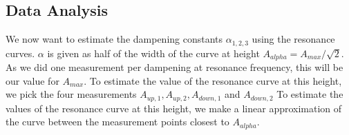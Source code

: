 \subsection{Data Analysis}

We now want to estimate the dampening constants $\alpha_{1, 2, 3}$ using the resonance curves.
$\alpha$ is given as half of the width of the curve at height $A_{alpha} = A_{max}/\sqrt{2}$.
As we did one measurement per dampening at resonance frequency, this will be our value for $A_{max}$.
To estimate the value of the resonance curve at this height, we pick the four measurements $A_{up, 1}, A_{up, 2}, A_{down, 1}$ and $A_{down, 2}$
To estimate the values of the resonance curve at this height, we make a linear approximation of the curve between the measurement points closest to $A_{alpha}$.
